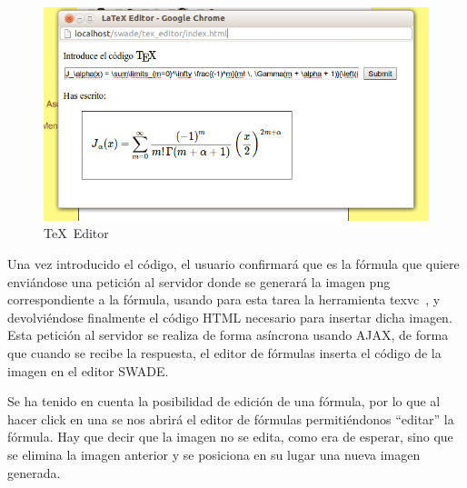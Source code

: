 \begin{figure}[h!]
  \centering
      \includegraphics[width=5in]{fig/swade_test2}
  \caption{\rm\TeX\ Editor}
  \label{fig:test2}

\end{figure}

Una vez introducido el código, el usuario confirmará que es la fórmula que quiere enviándose una petición al servidor donde se generará la imagen png correspondiente a la fórmula, usando para esta tarea la herramienta texvc~\cite{texvc}, y devolviéndose finalmente el código HTML necesario para insertar dicha imagen. Esta petición al servidor se realiza de forma asíncrona usando AJAX, de forma que cuando se recibe la respuesta, el editor de fórmulas inserta el código de la imagen en el editor SWADE. 

Se ha tenido en cuenta la posibilidad de edición de una fórmula, por lo que al hacer click en una se nos abrirá el editor de fórmulas permitiéndonos ``editar'' la fórmula. Hay que decir que la imagen no se edita, como era de esperar, sino que se elimina la imagen anterior y se posiciona en su lugar una nueva imagen generada.

 

